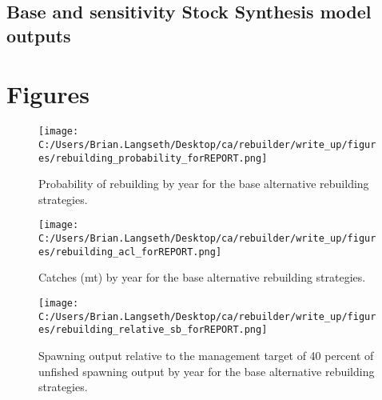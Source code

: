 \documentclass[11pt,
  english,
  letterpaper,
]{article}
\begin{document}

\hypertarget{base-and-sensitivity-stock-synthesis-model-outputs}{%
\subsection{Base and sensitivity Stock Synthesis model outputs}\label{base-and-sensitivity-stock-synthesis-model-outputs}}

\leavevmode\tagmcend\tagstructend



\clearpage


\hypertarget{figures}{%
\section{Figures}\label{figures}}

\leavevmode\tagmcend\tagstructend


\begin{figure}
\centering
\texttt{[image: C:/Users/Brian.Langseth/Desktop/ca/rebuilder/write\_up/figures/rebuilding\_probability\_forREPORT.png]}
\caption{Probability of rebuilding by year for the base alternative rebuilding strategies.\label{fig:prob-fig}}
\end{figure}

\tagmcend\tagstructend


\begin{figure}
\centering
\texttt{[image: C:/Users/Brian.Langseth/Desktop/ca/rebuilder/write\_up/figures/rebuilding\_acl\_forREPORT.png]}
\caption{Catches (mt) by year for the base alternative rebuilding strategies.\label{fig:acl-fig}}
\end{figure}

\tagmcend\tagstructend


\begin{figure}
\centering
\texttt{[image: C:/Users/Brian.Langseth/Desktop/ca/rebuilder/write\_up/figures/rebuilding\_relative\_sb\_forREPORT.png]}
\caption{Spawning output relative to the management target of 40 percent of unfished spawning output by year for the base alternative rebuilding strategies.\label{fig:rel-ssb-fig}}
\end{figure}
\end{document}
